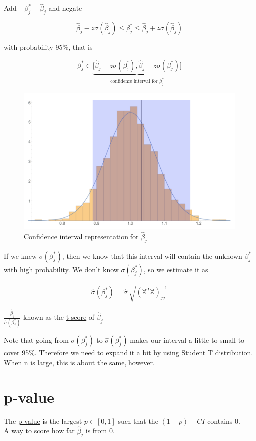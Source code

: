 \documentclass[a4paper]{article}
\newcommand{\bhj}{\widehat{\beta}_j}
\newcommand{\bsj}{\beta^*_j}
\newcommand{\sbsj}{\sigma(\bsj)}
\begin{document}
Add $-\bsj-\bhj$ and negate

$$\bhj-z\sigma(\bhj)\leq \bsj\leq \bhj+z\sigma(\bhj)$$

with probability 95\%, that is

$$\bsj\in\underbrace{\big[\bhj-z\sigma(\bsj),\bhj+z\sigma(\bsj)\big]}_\text{confidence interval for $\bsj$}$$

\begin{figure}[h]
	\centering
	\includegraphics[width=1.0\textwidth]{f2.png}
	\caption{Confidence interval representation for $\bhj$}
\end{figure}

\newpage 
If we knew $\sbsj$, then we know that this interval will contain the unknown $\bsj$ with high probability.
We don't know $\sbsj$, so we estimate it as 

$$\widehat{\sigma}(\bsj)=\widehat{\sigma}\sqrt[]{(\mathbb{X}^T\mathbb{X})^{-1}_{jj}}$$

$\frac{\bhj}{\widehat{\sigma}(\bsj)}$ known as the \underline{t-score} of $\bhj$

Note that going from $\sigma(\bsj)$ to $\widehat{\sigma}(\bsj)$ makes our interval a little to small to cover 95\%. Therefore we need to expand it a bit by using Student T distribution.\\
When n is large, this is about the same, however.

\section*{p-value}
The \underline{p-value} is the largest $p\in[0,1]$ such that the $(1-p)-CI$ contains 0.\\
A way to score how far $\bhj$ is from 0.\\
\end{document}
